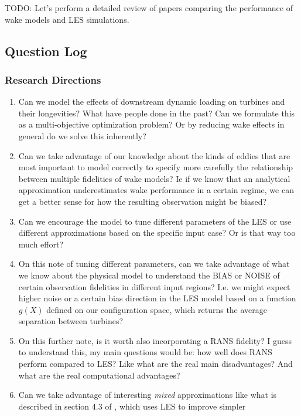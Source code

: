 \documentclass[12pt]{article}
\begin{document}
TODO: Let's perform a detailed review of papers comparing the performance of
wake models and LES simulations.

\subsection{Question Log}
\subsubsection{Research Directions}
\begin{enumerate}
    \item Can we model the effects of downstream dynamic loading on turbines
        and their longevities? What have people done in the past? Can we
        formulate this as a multi-objective optimization problem? Or by
        reducing wake effects in general do we solve this inherently?
    \item Can we take advantage of our knowledge about the kinds of eddies that are most
        important to model correctly to specify more carefully the relationship
        between multiple fidelities of wake models? Ie if we know that
        an analytical approximation underestimates wake performance in a certain regime,
        we can get a better sense for how the resulting observation might be biased?
    \item Can we encourage the model to tune different parameters of the LES
        or use different approximations based on the specific input case? Or is
        that way too much effort?
    \item On this note of tuning different parameters, can we take advantage of what we
        know about the physical model to understand the BIAS or NOISE of certain
        observation fidelities in different input regions? I.e. we might expect higher
        noise or a certain bias direction in the LES model based on a function $g(X)$
        defined on our configuration space, which returns the average separation
        between turbines?
    \item On this further note, is it worth also incorporating a RANS fidelity?
        I guess to understand this, my main questions would be: how well
        does RANS perform compared to LES? Like what are the real main disadvantages?
        And what are the real computational advantages?
    \item Can we take advantage of interesting \emph{mixed} approximations like
        what is described in section 4.3 of
        \cite{mehtaLargeEddySimulation2014}, which uses LES to improve simpler

\end{enumerate}
\end{document}
